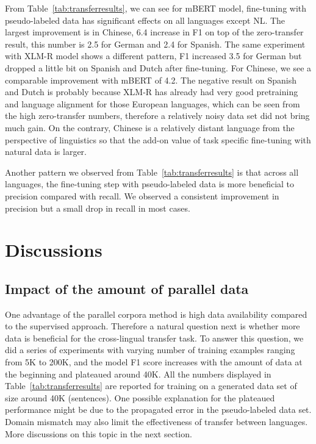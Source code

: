 \documentclass[11pt]{article}
\begin{document}
From Table~\ref{tab:transferresults}, we can see for mBERT model, fine-tuning with pseudo-labeled data has significant effects on all languages except NL. The largest improvement is in Chinese, 6.4 increase in F1 on top of the zero-transfer result, this number is 2.5 for German and 2.4 for Spanish. The same experiment with XLM-R model shows a different pattern, F1 increased 3.5 for German but dropped a little bit on Spanish and Dutch after fine-tuning. For Chinese, we see a comparable improvement with mBERT of 4.2. The negative result on Spanish and Dutch is probably because XLM-R has already had very good pretraining and language alignment for those European languages, which can be seen from the high zero-transfer numbers, therefore a relatively noisy data set did not bring much gain. On the contrary, Chinese is a relatively distant language from the perspective of linguistics so that the add-on value of task specific fine-tuning with natural data is larger.

Another pattern we observed from Table~\ref{tab:transferresults} is that across all languages, the fine-tuning step with pseudo-labeled data is more beneficial to precision compared with recall. We observed a consistent improvement in precision but a small drop in recall in most cases.

\section{Discussions}
\label{section:further}

\subsection{Impact of the amount of parallel data}
One advantage of the parallel corpora method is high data availability compared to the supervised approach. Therefore a natural question next is whether more data is beneficial for the cross-lingual transfer task. To answer this question, we did a series of experiments with varying number of training examples ranging from 5K to 200K, and the model F1 score increases with the amount of data at the beginning and plateaued around 40K. All the numbers displayed in Table~\ref{tab:transferresults} are reported for training on a generated data set of size around 40K (sentences). One possible explanation for the plateaued performance might be due to the propagated error in the pseudo-labeled data set. Domain mismatch may also limit the effectiveness of transfer between languages. More discussions on this topic in the next section. 
\end{document}
